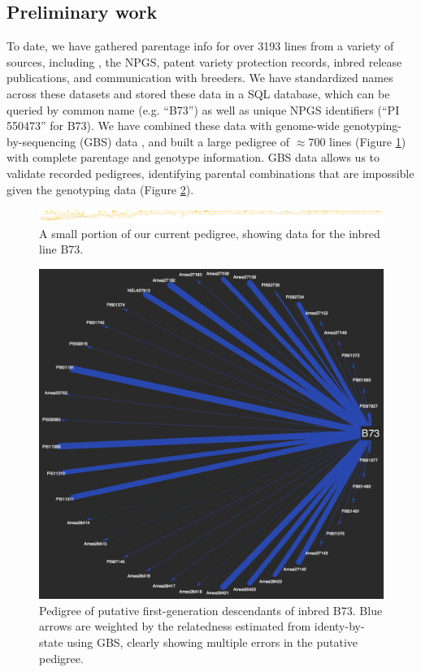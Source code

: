 \documentclass[12pt]{article}
\begin{document}
{\subsection*{Preliminary work}
To date, we have gathered parentage info for over 3193 lines from a variety of sources, including \cite{gerdes1993compilation}, the NPGS, patent variety protection records, inbred release publications, and communication with breeders.
We have standardized names across these datasets and stored these data in a SQL database, which can be queried by common name (e.g. ``B73'') as well as unique NPGS identifiers (``PI 550473'' for B73).
We have combined these data with genome-wide genotyping-by-sequencing (GBS) data \citep{romay2013comprehensive}, and built a large pedigree of $\approx$700 lines (Figure \ref{fig:b73isbig}) with complete parentage and genotype information. GBS data allows us to validate recorded pedigrees, identifying parental combinations that are impossible given the genotyping data (Figure \ref{fig:notthemomma}).

\begin{figure}
\includegraphics[width=1.0\linewidth]{pedigree_poster.pdf}
\caption{A small portion of our current pedigree, showing data for the inbred line B73.}
\label{fig:b73isbig}
\end{figure}

\begin{figure}
\includegraphics[width=0.6\linewidth]{weighted.png}
\caption{Pedigree of putative first-generation descendants of inbred B73. Blue arrows are weighted by the relatedness estimated from identy-by-state using GBS, clearly showing multiple errors in the putative pedigree.}
\label{fig:notthemomma}
\end{figure}

}
\end{document}

